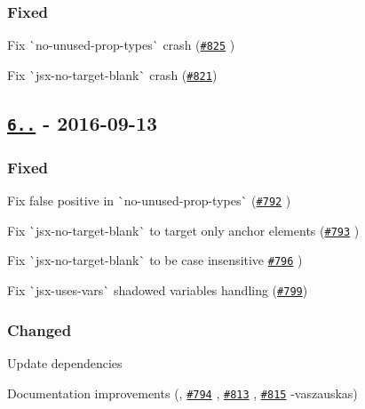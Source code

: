 \subsubsection*{Fixed}


\begin{DoxyItemize}
\item Fix \`{}no-\/unused-\/prop-\/types\`{} crash (\href{https://github.com/yannickcr/eslint-plugin-react/pull/825}{\tt \#825} )
\item Fix \`{}jsx-\/no-\/target-\/blank\`{} crash (\href{https://github.com/yannickcr/eslint-plugin-react/issues/821}{\tt \#821})
\end{DoxyItemize}

\subsection*{\href{https://github.com/yannickcr/eslint-plugin-react/compare/v6.2.0...v6.2.1}{\tt 6..} -\/ 2016-\/09-\/13}

\subsubsection*{Fixed}


\begin{DoxyItemize}
\item Fix false positive in \`{}no-\/unused-\/prop-\/types\`{} (\href{https://github.com/yannickcr/eslint-plugin-react/pull/792}{\tt \#792} )
\item Fix \`{}jsx-\/no-\/target-\/blank\`{} to target only anchor elements (\href{https://github.com/yannickcr/eslint-plugin-react/pull/793}{\tt \#793} )
\item Fix \`{}jsx-\/no-\/target-\/blank\`{} to be case insensitive \href{https://github.com/yannickcr/eslint-plugin-react/pull/796}{\tt \#796} )
\item Fix \`{}jsx-\/uses-\/vars\`{} shadowed variables handling (\href{https://github.com/yannickcr/eslint-plugin-react/issues/799}{\tt \#799})
\end{DoxyItemize}

\subsubsection*{Changed}


\begin{DoxyItemize}
\item Update dependencies
\item Documentation improvements (, \href{https://github.com/yannickcr/eslint-plugin-react/pull/794}{\tt \#794} , \href{https://github.com/yannickcr/eslint-plugin-react/pull/813}{\tt \#813} , \href{https://github.com/yannickcr/eslint-plugin-react/pull/815}{\tt \#815} -\/vaszauskas)
\end{DoxyItemize}

